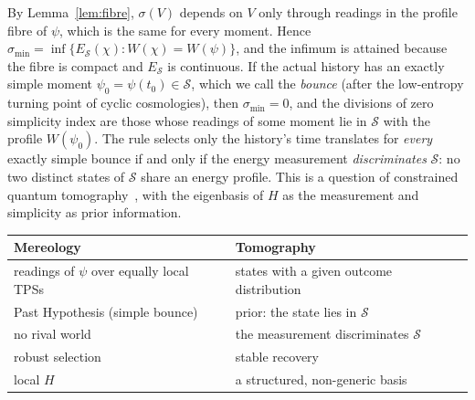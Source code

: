 \documentclass[11pt]{article}
\theoremstyle{definition}
\theoremstyle{remark}
\begin{document}
By Lemma~\ref{lem:fibre}, $\sigma(V)$ depends on $V$ only through readings in the profile fibre of $\psi$, which is the same for every moment. Hence $\sigma_{\min}=\inf\{E_{\mathcal S}(\chi):W(\chi)=W(\psi)\}$, and the infimum is attained because the fibre is compact and $E_{\mathcal S}$ is continuous. If the actual history has an exactly simple moment $\psi_0=\psi(t_0)\in\mathcal S$, which we call the \emph{bounce} (after the low-entropy turning point of cyclic cosmologies), then $\sigma_{\min}=0$, and the divisions of zero simplicity index are those whose readings of some moment lie in $\mathcal S$ with the profile $W(\psi_0)$. The rule selects only the history's time translates for \emph{every} exactly simple bounce if and only if the energy measurement \emph{discriminates} $\mathcal S$: no two distinct states of $\mathcal S$ share an energy profile. This is a question of constrained quantum tomography~\cite{HMW2013,KechWolf2017}, with the eigenbasis of $H$ as the measurement and simplicity as prior information.

\begin{center}
\begin{tabular}{ll}
\toprule
Mereology & Tomography \\
\midrule
readings of $\psi$ over equally local TPSs & states with a given outcome distribution \\
Past Hypothesis (simple bounce) & prior: the state lies in $\mathcal S$ \\
no rival world & the measurement discriminates $\mathcal S$ \\
robust selection & stable recovery \\
local $H$ & a structured, non-generic basis \\
\bottomrule
\end{tabular}
\end{center}
\end{document}
